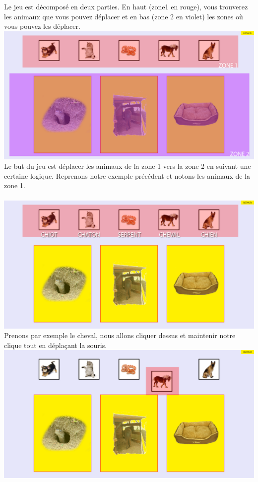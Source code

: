 \documentclass{article}
\begin{document}
Le jeu est d\'ecompos\'e en deux parties. En haut (zone1 en rouge), vous trouverez les animaux que vous pouvez d\'eplacer et en bas (zone 2 en violet) les zones o\`u vous pouvez les d\'eplacer.
\vspace{0.5cm}\\
\includegraphics[width=1.0\textwidth]{zone}
\vspace{0.5cm}\\
Le but du jeu est d\'eplacer les animaux de la zone 1 vers la zone 2 en suivant une certaine logique. Reprenons notre exemple pr\'ec\'edent et notons les animaux de la zone 1.\\
\vspace{0.5cm}\\
\includegraphics[width=1.0\textwidth]{zone1}
\vspace{0.5cm}\\
Prenons par exemple le cheval, nous allons cliquer dessus et maintenir notre clique tout en d\'epla\c{c}ant la souris.
\vspace{0.5cm}\\
\includegraphics[width=1.0\textwidth]{zone2}
\end{document}
